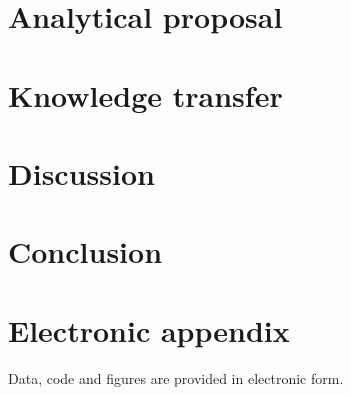 \documentclass[12pt]{article}
\begin{document}
\section{Analytical proposal}
\label{analysis}


\section{Knowledge transfer}
\label{teaching}


\section{Discussion}
\label{discussion}


\section{Conclusion}
\label{conclusion}


\newpage

    


\setcounter{page}{4}

\appendix

% 

\section{Electronic appendix}
\label{el_app}

Data, code and figures are provided in electronic form.

\newpage
    
\end{document}
